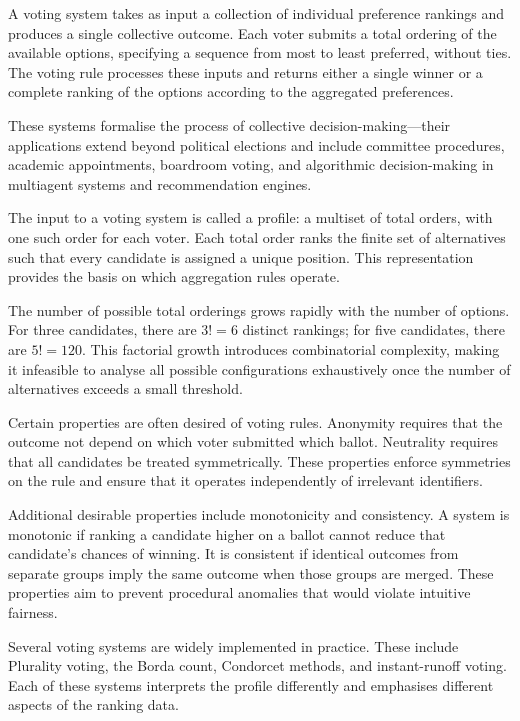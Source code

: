 A voting system takes as input a collection of individual preference rankings and produces a single collective outcome. Each voter submits a total ordering of the available options, specifying a sequence from most to least preferred, without ties. The voting rule processes these inputs and returns either a single winner or a complete ranking of the options according to the aggregated preferences.

These systems formalise the process of collective decision-making—their applications extend beyond political elections and include committee procedures, academic appointments, boardroom voting, and algorithmic decision-making in multiagent systems and recommendation engines.

The input to a voting system is called a profile: a multiset of total orders, with one such order for each voter. Each total order ranks the finite set of alternatives such that every candidate is assigned a unique position. This representation provides the basis on which aggregation rules operate.

The number of possible total orderings grows rapidly with the number of options. For three candidates, there are $3! = 6$ distinct rankings; for five candidates, there are $5! = 120$. This factorial growth introduces combinatorial complexity, making it infeasible to analyse all possible configurations exhaustively once the number of alternatives exceeds a small threshold.

Certain properties are often desired of voting rules. Anonymity requires that the outcome not depend on which voter submitted which ballot. Neutrality requires that all candidates be treated symmetrically. These properties enforce symmetries on the rule and ensure that it operates independently of irrelevant identifiers.

Additional desirable properties include monotonicity and consistency. A system is monotonic if ranking a candidate higher on a ballot cannot reduce that candidate’s chances of winning. It is consistent if identical outcomes from separate groups imply the same outcome when those groups are merged. These properties aim to prevent procedural anomalies that would violate intuitive fairness.

Several voting systems are widely implemented in practice. These include Plurality voting, the Borda count, Condorcet methods, and instant-runoff voting. Each of these systems interprets the profile differently and emphasises different aspects of the ranking data.

